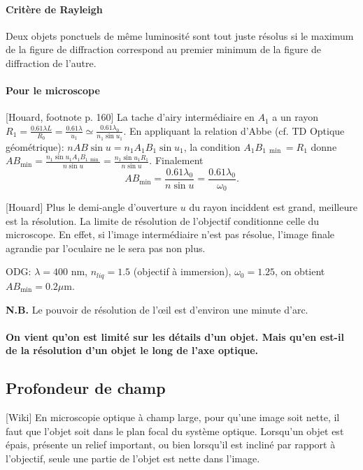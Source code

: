 \documentclass[11pt]{report}
\numberwithin{figure}{section}
\numberwithin{equation}{section}
\numberwithin{table}{section}
\newcommand{\1}{\boldsymbol{1}}
\begin{document}
\paragraph{Critère de Rayleigh} Deux objets ponctuels de même luminosité sont tout juste résolus si le maximum de la figure de diffraction correspond au premier minimum de la figure de diffraction de l'autre. 

\paragraph{Pour le microscope} [Houard, footnote p. 160] La tache d'airy intermédiaire en $A_1$ a un rayon $R_1 = \frac{0.61 \lambda L}{R_0} = \frac{0.61 \lambda}{u_1} \simeq \frac{0.61 \lambda_0}{n_1 \sin u_1}$. En appliquant la relation d'Abbe (cf. TD Optique géométrique): $n AB \sin u = n_1 A_1B_1 \sin u_1$, la condition 
$A_1B_{1~\min} = R_1$ donne $AB_{\min} = \frac{n_1 \sin u_1 A_1B_{1~\min}}{n \sin u} = \frac{n_1 \sin u_1 R_1}{n \sin u}$. Finalement
\begin{equation}
AB_{\min} = \frac{0.61 \lambda_0}{n \sin u} = \frac{0.61 \lambda_0}{\omega_0}.
\end{equation}

[Houard] Plus le demi-angle d'ouverture $u$ du rayon inciddent est grand, meilleure est la résolution. La limite de résolution de l'objectif conditionne celle du microscope. En effet, si l'image intermédiaire n'est pas résolue, l'image finale agrandie par l'oculaire ne le sera pas non plus.

ODG: $\lambda = 400$ nm, $n_{liq} = 1.5$ (objectif à immersion), $\omega_0 = 1.25$, on obtient $AB_{\min} = 0.2 \mu$m.

\textbf{N.B.} Le pouvoir de résolution de l'œil est d'environ une minute d'arc.

\paragraph{On vient qu'on est limité sur les détails d'un objet. Mais qu'en est-il de la résolution d'un objet le long de l'axe optique.}

\subsection{Profondeur de champ}

[Wiki] En microscopie optique à champ large, pour qu'une image soit nette, il faut que l'objet soit dans le plan focal du système optique. Lorsqu'un objet est épais, présente un relief important, ou bien lorsqu'il est incliné par rapport à l'objectif, seule une partie de l'objet est nette dans l’image.
\end{document}
